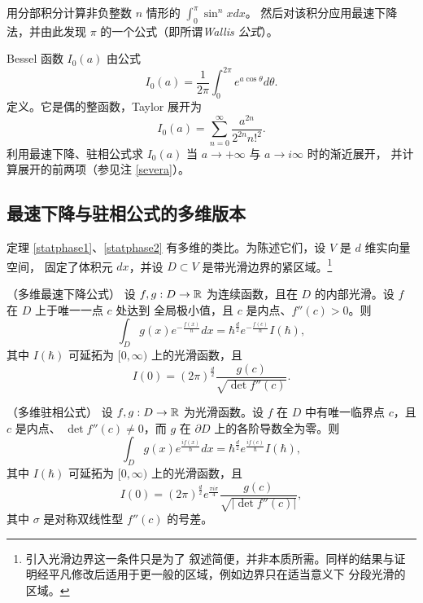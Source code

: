 \begin{exercise} 用分部积分计算非负整数 $n$ 情形的 $\int_0^\pi \sin^nxdx$。
然后对该积分应用最速下降法，并由此发现 $\pi$ 的一个公式（即所谓\emph{Wallis 公式}）。
\end{exercise} 

\begin{exercise} Bessel 函数 $I_0(a)$ 由公式
$$
I_0(a)=\frac{1}{2\pi}\int_0^{2\pi} e^{a\cos \theta} d\theta.
$$
定义。它是偶的整函数，Taylor 展开为
$$
I_0(a)=\sum_{n=0}^\infty \frac{a^{2n}}{2^{2n}n!^2}.
$$
利用最速下降、驻相公式求 $I_0(a)$ 当 $a\to +\infty$ 与 $a\to i\infty$ 时的渐近展开，
并计算展开的前两项（参见注 \ref{severa}）。
\end{exercise} 

\subsection{最速下降与驻相公式的多维版本}
定理 \ref{statphase1}、\ref{statphase2} 有多维的类比。为陈述它们，设 $V$ 是 $d$ 维实向量空间，
固定了体积元 $dx$，并设 $D\subset V$ 是带光滑边界的紧区域。\footnote{引入光滑边界这一条件只是为了
叙述简便，并非本质所需。同样的结果与证明经平凡修改后适用于更一般的区域，例如边界只在适当意义下
分段光滑的区域。}

\begin{theorem}\label{statphase3}（多维最速下降公式） \linebreak
设 $f,g: D\to \Bbb R$ 为连续函数，且在 $D$ 的内部光滑。设 $f$ 在 $D$ 上于唯一一点 $c$ 处达到
全局极小值，且 $c$ 是内点、$f''(c)>0$。则
\begin{equation}\label{intemult}
\int_{D} g(x)e^{-\frac{f(x)}{\hbar}}dx=\hbar^{\frac{d}{2}}e^{-\frac{f(c)}{\hbar}}I(\hbar),
\end{equation}
其中 $I(\hbar)$ 可延拓为 $[0,\infty)$ 上的光滑函数，且
$$
I(0)=
(2\pi)^{\frac{d}{2}}\frac{g(c)}{\sqrt{\det f''(c)}}.
$$ 
\end{theorem} 

\begin{theorem}\label{statphase4}（多维驻相公式）
设 $f,g: D\to \Bbb R$ 为光滑函数。设 $f$ 在 $D$ 中有唯一临界点 $c$，且 $c$ 是内点、
$\det f''(c)\ne 0$，而 $g$ 在 $\partial D$ 上的各阶导数全为零。则
\begin{equation}\label{intemult1}
\int_{D} g(x)e^{\frac{if(x)}{\hbar}}dx=\hbar^{\frac{d}{2}}e^{\frac{if(c)}{\hbar}}I(\hbar),
\end{equation}
其中 $I(\hbar)$ 可延拓为 $[0,\infty)$ 上的光滑函数，且
$$
I(0)=
(2\pi)^{\frac{d}{2}}e^{\frac{\pi i\sigma}{4}}\frac{g(c)}{\sqrt{|\det f''(c)|}},
$$ 
其中 $\sigma$ 是对称双线性型 $f''(c)$ 的号差。
\end{theorem} 

